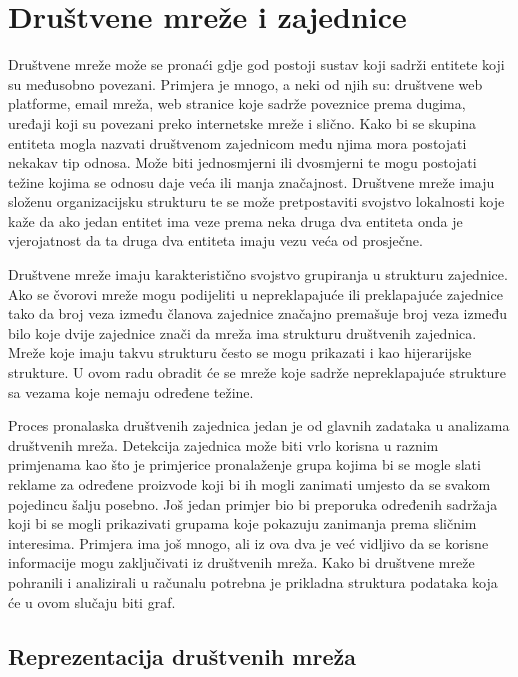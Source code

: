 \chapter{Društvene mreže i zajednice}

Društvene mreže može se pronaći gdje god postoji sustav koji sadrži entitete koji su međusobno povezani. Primjera je mnogo, a neki od njih su: društvene web platforme, email mreža, web stranice koje sadrže poveznice prema dugima, uređaji koji su povezani preko internetske mreže i slično. 
Kako bi se skupina entiteta mogla nazvati društvenom zajednicom među njima mora postojati nekakav tip odnosa. Može biti jednosmjerni ili dvosmjerni te mogu postojati težine kojima se odnosu daje veća ili manja značajnost. Društvene mreže imaju složenu organizacijsku strukturu te se može pretpostaviti svojstvo lokalnosti koje kaže da ako jedan entitet ima veze prema neka druga dva entiteta onda je vjerojatnost da ta druga dva entiteta imaju vezu veća od prosječne. 

Društvene mreže imaju karakteristično svojstvo grupiranja u strukturu zajednice. Ako se čvorovi mreže mogu podijeliti u nepreklapajuće ili preklapajuće zajednice tako da broj veza između članova zajednice značajno premašuje broj veza između bilo koje dvije zajednice znači da mreža ima strukturu društvenih zajednica. Mreže koje imaju takvu strukturu često se mogu prikazati i kao hijerarijske strukture. U ovom radu obradit će se mreže koje sadrže nepreklapajuće strukture sa vezama koje nemaju određene težine.

Proces pronalaska društvenih zajednica jedan je od glavnih zadataka u analizama društvenih mreža. Detekcija zajednica može biti vrlo korisna u raznim primjenama kao što je primjerice pronalaženje grupa kojima bi se mogle slati reklame za određene proizvode koji bi ih mogli zanimati umjesto da se svakom pojedincu šalju posebno. Još jedan primjer bio bi preporuka određenih sadržaja koji bi se mogli prikazivati grupama koje pokazuju zanimanja prema sličnim interesima. Primjera ima još mnogo, ali iz ova dva je već vidljivo da se korisne informacije mogu zaključivati iz društvenih mreža. Kako bi društvene mreže pohranili i analizirali u računalu potrebna je prikladna struktura podataka koja će u ovom slučaju biti graf.

\section{Reprezentacija društvenih mreža}

